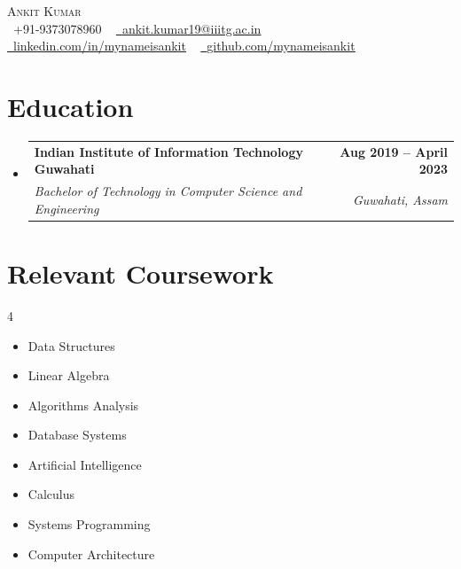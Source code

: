 \documentclass[letterpaper,11pt]{article}
\makeatletter
\newcommand{\resumeSubheading}[4]{
  \vspace{-2pt}\item
    \begin{tabular*}{1.0\textwidth}[t]{l@{\extracolsep{\fill}}r}
      \textbf{#1} & \textbf{\small #2} \\
      \textit{\small#3} & \textit{\small #4} \\
    \end{tabular*}\vspace{-7pt}
}
\newcommand{\resumeSubHeadingListStart}{\begin{itemize}[leftmargin=0.0in, label={}]}
\newcommand{\resumeSubHeadingListEnd}{\end{itemize}}
\makeatother
\begin{document}
\begin{center}
    {\Huge \scshape Ankit Kumar} \\ \vspace{1pt}
    \small \raisebox{-0.1\height}\faPhone\ +91-9373078960 ~ \href{mailto:ankit.kumar19@iiitg.ac.in}{\raisebox{-0.2\height}\faEnvelope\  \underline{ankit.kumar19@iiitg.ac.in}} ~ 
    \href{https://linkedin.com/in/mynameisankit}{\raisebox{-0.2\height}\faLinkedin\ \underline{linkedin.com/in/mynameisankit}}  ~
    \href{https://github.com/mynameisankit}{\raisebox{-0.2\height}\faGithub\ \underline{github.com/mynameisankit}}
    \vspace{-8pt}
\end{center}


\section{Education}
  \resumeSubHeadingListStart
    \resumeSubheading
      {Indian Institute of Information Technology Guwahati}{Aug 2019 -- April 2023}
      {Bachelor of Technology in Computer Science and Engineering}{Guwahati, Assam}
  \resumeSubHeadingListEnd

\section{Relevant Coursework}
        \begin{multicols}{4}
            \begin{itemize}[itemsep=-5pt, parsep=3pt]
                \item\small Data Structures
                \item Linear Algebra
                \item Algorithms Analysis
                \item Database Systems
                \item Artificial Intelligence
                \item Calculus
                \item Systems Programming
                \item Computer Architecture
            \end{itemize}
        \end{multicols}
        \vspace*{2.0\multicolsep}
\end{document}
